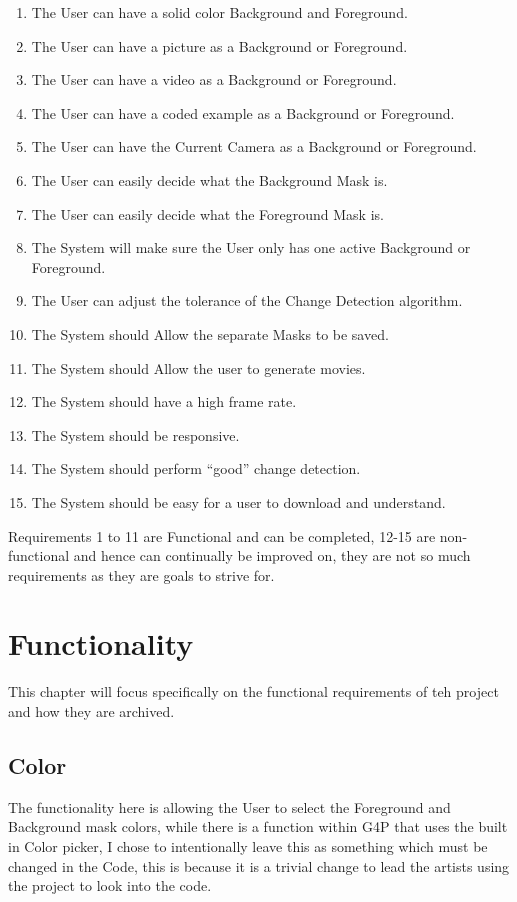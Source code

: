 \documentclass[a4paper]{report}
\begin{document}
\begin{enumerate}
\item The User can have a solid color Background and Foreground.
\item The User can have a picture as a Background or Foreground.
\item The User can have a video as a Background or Foreground.
\item The User can have a coded example as a Background or Foreground.
\item The User can have the Current Camera as a Background or Foreground.
\item The User can easily decide what the Background Mask is.
\item The User can easily decide what the Foreground Mask is.
\item The System will make sure the User only has one active Background or Foreground.
\item The User can adjust the tolerance of the Change Detection algorithm.
\item The System should Allow the separate Masks to be saved.
\item The System should Allow the user to generate movies.
\item The System should have a high frame rate.
\item The System should be responsive.
\item The System should perform “good” change detection.
\item The System should be easy for a user to download and understand.
\end{enumerate}

Requirements 1 to 11 are Functional and can be completed, 12-15 are non-functional and hence can continually be improved on, they are not so much requirements as they are goals to strive for.

\chapter{Functionality}
This chapter will focus specifically on the functional requirements of teh project and how they are archived.
\section{Color}
The functionality here is allowing the User to select the Foreground and Background mask colors, while there is a function within G4P\cite{G4P} that uses the built in Color picker, I chose to intentionally leave this as something which must be changed in the Code, this is because it is a trivial change to lead the artists using the project to look into the code.
\end{document}
